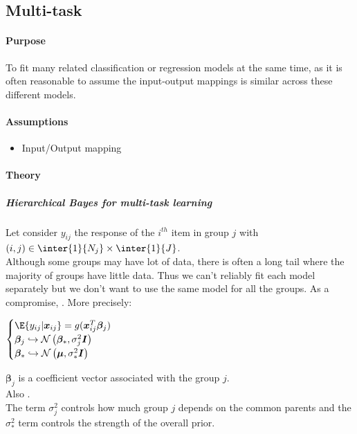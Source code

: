 \subsection{Multi-task}
\paragraph{Purpose}
To fit many related classification or regression models at the same time, as it is often reasonable
to assume the input-output mappings is similar across these different models.

\paragraph{Assumptions}
\begin{itemize}
    \item Input/Output mapping
\end{itemize}

\paragraph{Theory}
\subparagraph{Hierarchical Bayes for multi-task learning}
Let consider $y_{ij}$ the response of the $i^{th}$ item in group $j$ with $(i,j)\in\inter{1}{N_{j}}
\times\inter{1}{J}$.\\
Although some groups may have lot of data, there is often a long tail where the majority of groups
have little data. Thus we can't reliably fit each model separately but we don't want to use the
same model for all the groups. As a compromise, . More precisely:
\begin{center}
    $\begin{cases}
        \E{y_{ij}|\bm{x}_{ij}} = g(\bm{x}_{ij}^{T}\bm{\beta}_{j}) \\
        \bm{\beta}_{j} \hookrightarrow \mathcal{N}\left(\bm{\beta}_{*}, \sigma_{j}^{2}\bm{I}\right)\\
        \bm{\beta}_{*} \hookrightarrow \mathcal{N}\left(\bm{\mu}, \sigma_{*}^{2}\bm{I}\right)
    \end{cases}$
\end{center}
$\bm{\beta}_{j}$ is a coefficient vector associated with the group $j$.\\
Also .\\
The term $\sigma_{j}^{2}$ controls how much group $j$ depends on the common parents and the 
$\sigma_{*}^{2}$ term controls the strength of the overall prior.
